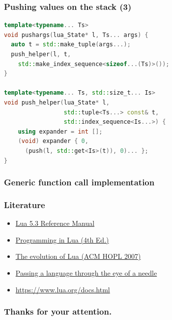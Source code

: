 \documentclass{beamer}
\newif\iftransitions
\begin{document}
\begin{frame}[fragile]
  \frametitle{Pushing values on the stack (3)}

  \begin{lstlisting}[language={C++}]
template<typename... Ts>
void pushargs(lua_State* l, Ts... args) {
  auto t = std::make_tuple(args...);
  push_helper(l, t,
    std::make_index_sequence<sizeof...(Ts)>());
}

template<typename... Ts, std::size_t... Is>
void push_helper(lua_State* l,
                 std::tuple<Ts...> const& t,
                 std::index_sequence<Is...>) {
    using expander = int [];
    (void) expander { 0,
      (push(l, std::get<Is>(t)), 0)... };
}
  \end{lstlisting}
\end{frame}


\begin{frame}

  \frametitle{Generic function call implementation}

\end{frame}

\iftransitions

\frame{%
\setbeamercolor{normal text}{fg=gray,bg=}
\setbeamercolor{alerted text}{fg=black,bg=}
\usebeamercolor{normal text}
\begin{itemize}
\item \alert<+>{Hallo}
\item \alert<+>{Welt}
\item \alert<+>{Foobar}
\end{itemize}
}

\fi

\begin{frame}
  \frametitle{Literature}

  \begin{itemize}
  \item \href{https://www.lua.org/manual/5.3/}{Lua 5.3 Reference Manual}
  \item \href{https://www.lua.org/pil/}{Programming in Lua (4th Ed.)}
  \item \href{https://www.lua.org/doc/hopl.pdf}{The evolution of Lua (ACM HOPL 2007)}
  \item \href{https://dl.acm.org/citation.cfm?id=1983083}{Passing a language through the eye of a needle}
  \item \href{https://www.lua.org/docs.html}{https://www.lua.org/docs.html}
  \end{itemize}
\end{frame}

\begin{frame}
  \frametitle{Thanks for your attention.}
\end{frame}
\end{document}
